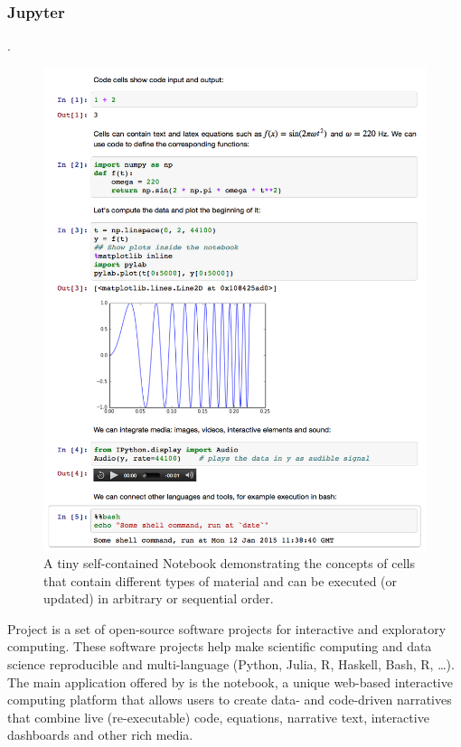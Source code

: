 \subsubsection{Jupyter}
\label{sec:jupyter}
.
\begin{figure}
\includegraphics[scale=0.23]{Pictures/jupyterdemo1.png}
\caption{\label{fig:jupyterdemo} A tiny self-contained Notebook demonstrating the concepts of cells that contain different types of material and can be executed (or updated) in arbitrary or sequential order.}
\end{figure}

Project \Jupyter is a set of open-source software projects for
interactive and exploratory computing. These software projects help
make scientific computing and data science reproducible and
multi-language (Python, Julia, R, Haskell, Bash, R, \ldots). The main
application offered by \Jupyter is the \Jupyter notebook, a unique
web-based interactive computing platform that allows users to create
data- and code-driven narratives that combine live (re-executable)
code, equations, narrative text, interactive dashboards and other rich
media. 


